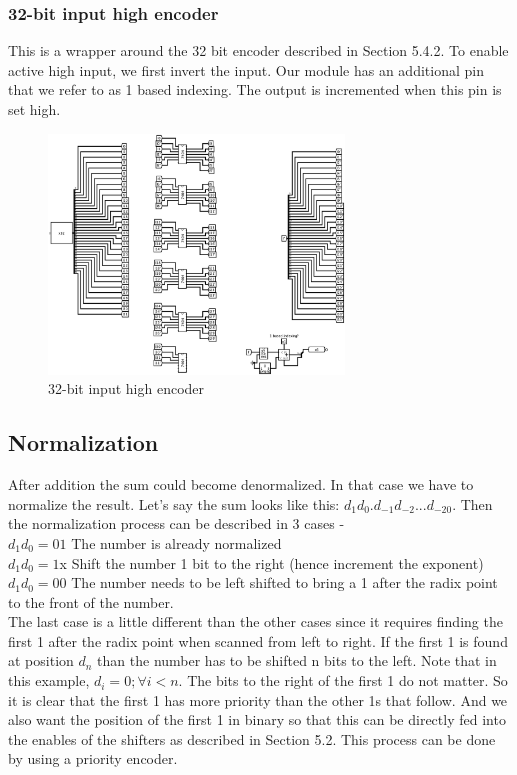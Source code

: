 \documentclass{article}
\begin{document}
\subsubsection{\textbf{32-bit input high encoder}}
This is a wrapper around the 32 bit encoder described in Section 5.4.2. To enable
active high input, we first invert the input. Our module has an additional pin
that we refer to as 1 based indexing. The output is incremented when this pin
is set high.
\begin{figure}[h]
    \centering 
    \includegraphics[width = 0.7\textwidth]{32high}
    \caption{32-bit input high encoder}
\end{figure}
\subsection{\textbf{Normalization}}
After addition the sum could become denormalized. In that case we have to
normalize the result. Let's say the sum looks like this: $d_1d_0.d_{-1}d_{-2}...d_{-20}.$
Then the normalization process can be described in 3 cases -
\\ 
$d_1d_0 = 01 $ The number is already normalized \\ 
$d_1d_0 = 1$x  Shift the number 1 bit to the right (hence increment the exponent) \\
$d_1d_0 = 00 $ The number needs to be left shifted to bring a 1 after the radix
point to the front of the number.
\\

The last case is a little different than the other cases since it requires finding
the first 1 after the radix point when scanned from left to right. If the first 1
is found at position $d_n$ than the number has to be shifted n bits to the left.
Note that in this example, $d_i = 0; \forall{i} < n$. The bits to the right of the first 1
do not matter. So it is clear that the first 1 has more priority than the other 1s
that follow. And we also want the position of the first 1 in binary so that this
can be directly fed into the enables of the shifters as described in Section 5.2.
This process can be done by using a priority encoder.
\\ 
\end{document}
